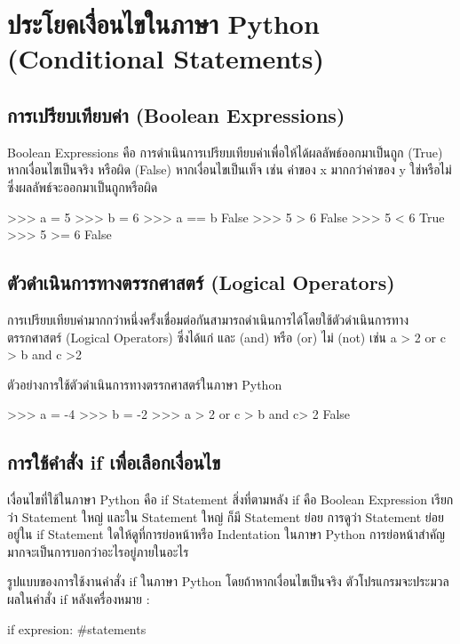  \chapter {ประโยคเงื่อนไขในภาษา Python (Conditional Statements)}

\section{การเปรียบเทียบค่า (Boolean Expressions)}

Boolean Expressions คือ การดำเนินการเปรียบเทียบค่าเพื่อให้ได้ผลลัพธ์ออกมาเป็นถูก (True) หากเงื่อนไขเป็นจริง หรือผิด (False) หากเงื่อนไขเป็นเท็จ เช่น ค่าของ x มากกว่าค่าของ y ใช่หรือไม่ ซึ่งผลลัพธ์จะออกมาเป็นถูกหรือผิด

\begin{pycode}
>>> a = 5
>>> b = 6
>>> a == b
False
>>> 5 > 6
False
>>> 5 < 6
True
>>> 5 >= 6
False
\end{pycode}


\section{ตัวดำเนินการทางตรรกศาสตร์ (Logical Operators)}

การเปรียบเทียบค่ามากกว่าหนึ่งครั้งเชื่อมต่อกันสามารถดำเนินการได้โดยใช้ตัวดำเนินการทาง ตรรกศาสตร์ (Logical Operators) ซึ่งได้แก่ และ (and) หรือ (or) ไม่ (not) เช่น a > 2 or c > b and c >2

ตัวอย่างการใช้ตัวดำเนินการทางตรรกศาสตร์ในภาษา Python

\begin{pycode}
>>> a = -4
>>> b = -2
>>> a > 2 or c > b and c> 2
False
\end{pycode}


\section{การใช้คำสั่ง if เพื่อเลือกเงื่อนไข}

เงื่อนไขที่ใช้ในภาษา Python คือ if Statement สิ่งที่ตามหลัง if คือ Boolean Expression เรียกว่า Statement ใหญ่ และใน Statement ใหญ่ ก็มี Statement ย่อย การดูว่า Statement ย่อยอยู่ใน if Statement ใดให้ดูที่การย่อหน้าหรือ Indentation ในภาษา Python การย่อหน้าสำคัญมากจะเป็นการบอกว่าอะไรอยู่ภายในอะไร 

รูปแบบของการใช้งานคำสั่ง if ในภาษา Python โดยถ้าหากเงื่อนไขเป็นจริง ตัวโปรแกรมจะประมวลผลในคำสั่ง if หลังเครื่องหมาย : 

\begin{pycode}
if expresion:
    #statements
\end{pycode}

